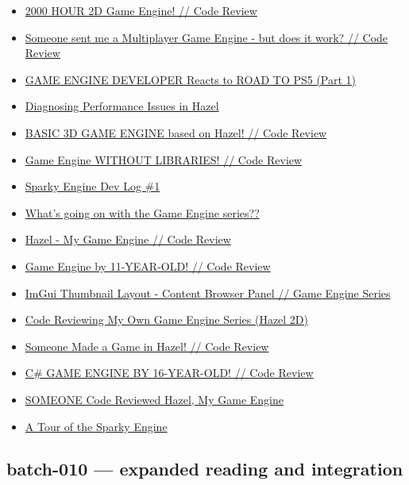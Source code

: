 \begin{itemize}
\item
  \href{https://www.youtube.com/watch?v=5b95WTHZ9HE}{2000 HOUR 2D Game Engine! // Code Review}
\item
  \href{https://www.youtube.com/watch?v=lAXOmE481j4}{Someone sent me a Multiplayer Game Engine - but does it work? // Code Review}
\item
  \href{https://www.youtube.com/watch?v=erxUR9SI4F0}{GAME ENGINE DEVELOPER Reacts to ROAD TO PS5 (Part 1)}
\item
  \href{https://www.youtube.com/watch?v=iY6QbL_3L2I}{Diagnosing Performance Issues in Hazel}
\item
  \href{https://www.youtube.com/watch?v=sIAXLH7ZqCw}{BASIC 3D GAME ENGINE based on Hazel! // Code Review}
\item
  \href{https://www.youtube.com/watch?v=v_BmwKl9Inc}{Game Engine WITHOUT LIBRARIES! // Code Review}
\item
  \href{https://www.youtube.com/watch?v=dXAIiCUrSv4}{Sparky Engine Dev Log \#1}
\item
  \href{https://www.youtube.com/watch?v=lwDdMYzUnxs}{What's going on with the Game Engine series??}
\item
  \href{https://www.youtube.com/watch?v=1W1FtRaY69Y}{Hazel - My Game Engine // Code Review}
\item
  \href{https://www.youtube.com/watch?v=dBlQv5GEBDc}{Game Engine by 11-YEAR-OLD! // Code Review}
\item
  \href{https://www.youtube.com/watch?v=uQljBVVb-lU}{ImGui Thumbnail Layout - Content Browser Panel // Game Engine Series}
\item
  \href{https://www.youtube.com/watch?v=aWGVjFTbXc8}{Code Reviewing My Own Game Engine Series (Hazel 2D)}
\item
  \href{https://www.youtube.com/watch?v=WOnMkazhP5I}{Someone Made a Game in Hazel! // Code Review}
\item
  \href{https://www.youtube.com/watch?v=kQc2BUjORhs}{C\# GAME ENGINE BY 16-YEAR-OLD! // Code Review}
\item
  \href{https://www.youtube.com/watch?v=Glq1oDBy1cQ}{SOMEONE Code Reviewed Hazel, My Game Engine}
\item
  \href{https://www.youtube.com/watch?v=32PRB7Tebbo}{A Tour of the Sparky Engine}
\end{itemize}

\subsection{batch-010 --- expanded reading and integration}\label{appendix-877738f6f4d2-batch-010-expanded-reading-and-integration}

